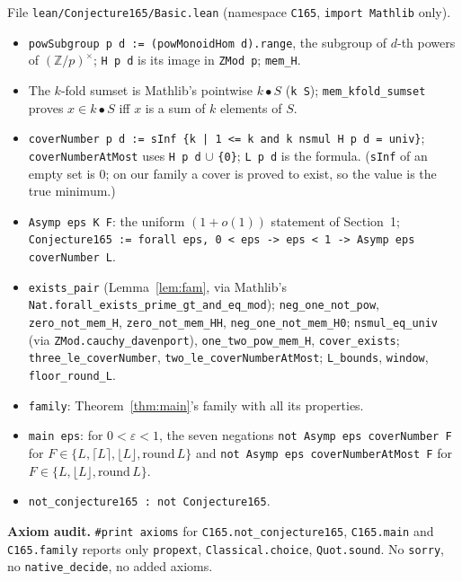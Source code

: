 \documentclass[11pt]{article}
\theoremstyle{definition}
\begin{document}
File \texttt{lean/Conjecture165/Basic.lean} (namespace \texttt{C165}, \texttt{import Mathlib} only).
\begin{itemize}
\item \texttt{powSubgroup p d := (powMonoidHom d).range}, the subgroup of $d$-th powers of
  $(\mathbb{Z}/p)^\times$; \texttt{H p d} is its image in \texttt{ZMod p}; \texttt{mem\_H}.
\item The $k$-fold sumset is Mathlib's pointwise $k\bullet S$ (\texttt{k \textbullet{} S}); \texttt{mem\_kfold\_sumset}
  proves $x\in k\bullet S$ iff $x$ is a sum of $k$ elements of $S$.
\item \texttt{coverNumber p d := sInf \{k | 1 <= k and k nsmul H p d = univ\}};
  \texttt{coverNumberAtMost} uses \texttt{H p d} $\cup$ \texttt{\{0\}}; \texttt{L p d} is the formula.
  (\texttt{sInf} of an empty set is $0$; on our family a cover is proved to exist, so the value is the
  true minimum.)
\item \texttt{Asymp eps K F}: the uniform $(1+o(1))$ statement of Section~1;
  \texttt{Conjecture165 := forall eps, 0 < eps -> eps < 1 -> Asymp eps coverNumber L}.
\item \texttt{exists\_pair} (Lemma~\ref{lem:fam}, via Mathlib's
  \texttt{Nat.forall\_exists\_prime\_gt\_and\_eq\_mod}); \texttt{neg\_one\_not\_pow},
  \texttt{zero\_not\_mem\_H}, \texttt{zero\_not\_mem\_HH}, \texttt{neg\_one\_not\_mem\_H0};
  \texttt{nsmul\_eq\_univ} (via \texttt{ZMod.cauchy\_davenport}), \texttt{one\_two\_pow\_mem\_H},
  \texttt{cover\_exists}; \texttt{three\_le\_coverNumber}, \texttt{two\_le\_coverNumberAtMost};
  \texttt{L\_bounds}, \texttt{window}, \texttt{floor\_round\_L}.
\item \texttt{family}: Theorem~\ref{thm:main}'s family with all its properties.
\item \texttt{main eps}: for $0<\varepsilon<1$, the seven negations
  \texttt{not Asymp eps coverNumber F} for $F\in\{L,\lceil L\rceil,\lfloor L\rfloor,\mathrm{round}\,L\}$ and
  \texttt{not Asymp eps coverNumberAtMost F} for $F\in\{L,\lfloor L\rfloor,\mathrm{round}\,L\}$.
\item \texttt{not\_conjecture165 : not Conjecture165}.
\end{itemize}
\textbf{Axiom audit.} \texttt{\#print axioms} for \texttt{C165.not\_conjecture165},
\texttt{C165.main} and \texttt{C165.family} reports only \texttt{propext},
\texttt{Classical.choice}, \texttt{Quot.sound}. No \texttt{sorry}, no \texttt{native\_decide}, no
added axioms.
\end{document}
